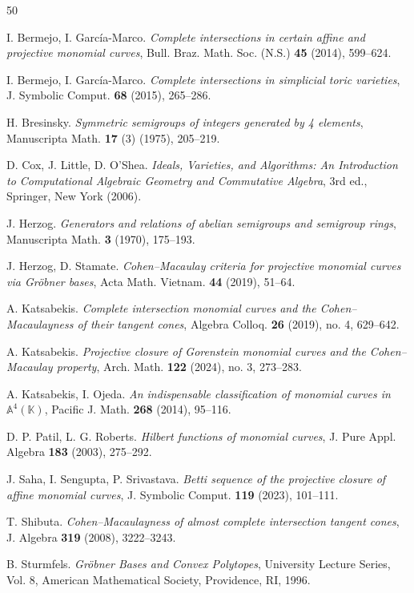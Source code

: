 \documentclass[10pt,a4paper]{amsart}
\begin{document}
\begin{thebibliography}{50}

 I. Bermejo, I. Garc\'ia-Marco.
{\em Complete intersections in certain affine and projective monomial curves},
Bull. Braz. Math. Soc. (N.S.) {\bf 45} (2014), 599--624.

 I. Bermejo, I. Garc\'ia-Marco.
{\em Complete intersections in simplicial toric varieties},
J. Symbolic Comput. {\bf 68} (2015), 265--286.

 H. Bresinsky.
{\em Symmetric semigroups of integers generated by 4 elements},
Manuscripta Math. {\bf 17} (3) (1975), 205--219.

 D. Cox, J. Little, D. O’Shea.
{\em Ideals, Varieties, and Algorithms: An Introduction to Computational Algebraic Geometry and Commutative Algebra},
3rd ed., Springer, New York (2006).

 J. Herzog.
{\em Generators and relations of abelian semigroups and semigroup rings},
Manuscripta Math. {\bf 3} (1970), 175--193.

 J. Herzog, D. Stamate.
{\em Cohen--Macaulay criteria for projective monomial curves via Gr\"obner bases},
Acta Math. Vietnam. {\bf 44} (2019), 51--64.

 A. Katsabekis.
{\em Complete intersection monomial curves and the Cohen--Macaulayness of their tangent cones},
Algebra Colloq. {\bf 26} (2019), no. 4, 629--642.

 A. Katsabekis.
{\em Projective closure of Gorenstein monomial curves and the Cohen--Macaulay property},
Arch. Math. {\bf 122} (2024), no. 3, 273--283.

 A. Katsabekis, I. Ojeda.
{\em An indispensable classification of monomial curves in $\mathbb{A}^{4}(\mathbb{K})$},
Pacific J. Math. {\bf 268} (2014), 95--116.

 D. P. Patil, L. G. Roberts. {\em Hilbert functions of monomial curves}, J. Pure Appl. Algebra {\bf 183} (2003), 275--292.

 J. Saha, I. Sengupta, P. Srivastava.
{\em Betti sequence of the projective closure of affine monomial curves},
J. Symbolic Comput. {\bf 119} (2023), 101--111.

 T. Shibuta.
{\em Cohen--Macaulayness of almost complete intersection tangent cones},
J. Algebra {\bf 319} (2008), 3222--3243.

 B. Sturmfels.
{\em Gr\"obner Bases and Convex Polytopes},
University Lecture Series, Vol. 8,
American Mathematical Society, Providence, RI, 1996.

	
\end{thebibliography}
\end{document}
